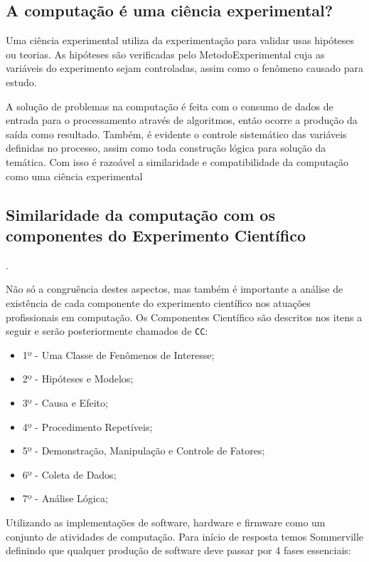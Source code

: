 \subsection{A computação é uma ciência experimental?}

Uma ciência experimental utiliza da experimentação para validar usas hipóteses ou teorias. As hipóteses são verificadas pelo \gls{MetodoExperimental} cuja as variáveis do experimento sejam controladas, assim como o fenômeno causado para estudo.

A solução de problemas na computação é feita com o consumo de dados de entrada para o processamento através de algoritmos, então ocorre a produção da saída como resultado. Também, é evidente o controle sistemático das variáveis definidas no processo, assim como toda construção lógica para solução da temática. Com isso é razoável a similaridade e compatibilidade da computação como uma ciência experimental

\subsection{Similaridade da computação com os componentes do Experimento Científico}.

Não só a congruência destes aspectos, mas também é importante a análise de existência de cada componente do experimento científico nos atuações profissionais em computação. Os Componentes Científico são descritos nos itens a seguir e serão posteriormente chamados de \texttt{CC}:

\begin{itemize}
    \item 1º - Uma Classe de Fenômenos de Interesse;
    \item 2º - Hipóteses e Modelos;
    \item 3º - Causa e Efeito;
    \item 4º - Procedimento Repetíveis;
    \item 5º - Demonstração, Manipulação e Controle de Fatores;
    \item 6º - Coleta de Dados;
    \item 7º - Análise Lógica;
\end{itemize}

Utilizando as implementações de software, hardware e firmware como um conjunto de atividades de computação. Para início de resposta temos Sommerville definindo que qualquer produção de software deve passar por 4 fases essenciais: 

